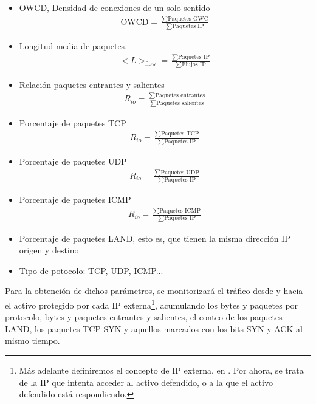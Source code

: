 \begin{itemize}
 \item \gls{OWCD}, Densidad de conexiones de un solo sentido
 \begin{align}
  \text{OWCD} = \frac{\sum\text{Paquetes OWC}}{\sum\text{Paquetes IP}}
 \end{align}

 \item Longitud media de paquetes.
 \begin{align}
  <L>_{\text{flow}} = \frac{\sum\text{Paquetes IP}}{\sum\text{Flujos IP}}
 \end{align}
 
 \item Relación paquetes entrantes y salientes
 \begin{align}
  R_{io} = \frac{\sum\text{Paquetes entrantes}}{\sum\text{Paquetes salientes}}
 \end{align}
 
 \item Porcentaje de paquetes TCP
 \begin{align}
  R_{io} = \frac{\sum\text{Paquetes TCP}}{\sum\text{Paquetes IP}}
 \end{align}
 
 \item Porcentaje de paquetes UDP
 \begin{align}
  R_{io} = \frac{\sum\text{Paquetes UDP}}{\sum\text{Paquetes IP}}
 \end{align}
 
 \item Porcentaje de paquetes ICMP
 \begin{align}
  R_{io} = \frac{\sum\text{Paquetes ICMP}}{\sum\text{Paquetes IP}}
 \end{align}
 
 \item Porcentaje de paquetes LAND, esto es, que tienen la misma dirección IP origen y destino
 \item Tipo de potocolo: \gls{TCP}, \gls{UDP}, \gls{ICMP}... 
\end{itemize}

Para la obtención de dichos parámetros, se monitorizará el tráfico desde y hacia el activo protegido por cada IP 
externa\footnote{Más adelante definiremos el concepto de \gls{IP} externa, en . Por ahora, se 
trata de la \gls{IP} que intenta acceder al activo defendido, o a la que el activo defendido está respondiendo.}, 
acumulando los bytes y paquetes por protocolo, bytes y paquetes entrantes y salientes, el conteo de los paquetes LAND, 
los paquetes \gls{TCP} \gls{SYN} y aquellos marcados con los bits \gls{SYN} y \gls{ACK} al mismo tiempo. 

